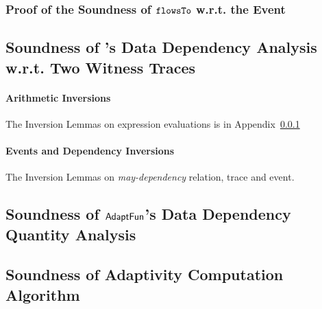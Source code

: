 \subsubsection{Proof of the Soundness of $\mathtt{flowsTo}$ w.r.t. the Event}
\label{apdx:flowsto_event_soundness}


\clearpage
\subsection{Soundness of {\THESYSTEM}'s Data Dependency Analysis w.r.t. Two Witness Traces}
\label{apdx:flowsto_soundness_extend}

\paragraph*{Arithmetic Inversions}
The Inversion Lemmas on expression evaluations is in Appendix~\ref{apdx:flowsto_event_soundness}
\paragraph*{Events and Dependency Inversions}
The Inversion Lemmas on \emph{may-dependency} relation, trace and event.


\subsection{Soundness of $\textsf{AdaptFun}$'s Data Dependency Quantity Analysis}
\label{apdx:reachability_soundness}



\clearpage
\subsection{Soundness of Adaptivity Computation Algorithm}
\label{apdx:adaptalg_soundness}


